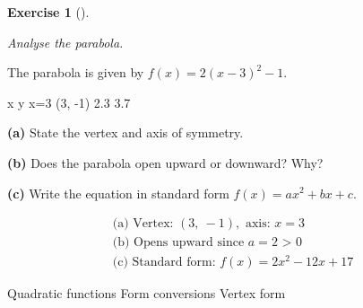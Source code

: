 \documentclass[
  letterpaper,
  DIV=11,
  numbers=noendperiod]{scrreprt}
\theoremstyle{definition}
\newtheorem{exercise}{Exercise}[chapter]
\theoremstyle{remark}
\begin{document}
\begin{exercise}[]\protect\hypertarget{exr-u7-20}{}\label{exr-u7-20}

\emph{Analyse the parabola.}

The parabola is given by \(f(x) = 2(x - 3)^2 - 1\).

x y x=3 (3, -1) 2.3 3.7

\textbf{(a)} State the vertex and axis of symmetry.

\textbf{(b)} Does the parabola open upward or downward? Why?

\textbf{(c)} Write the equation in standard form
\(f(x) = ax^2 + bx + c\).

\begin{tcolorbox}[enhanced jigsaw, opacitybacktitle=0.6, coltitle=black, arc=.35mm, colframe=quarto-callout-tip-color-frame, colback=white, bottomrule=.15mm, left=2mm, colbacktitle=quarto-callout-tip-color!10!white, titlerule=0mm, opacityback=0, title=\textcolor{quarto-callout-tip-color}{\faLightbulb}\hspace{0.5em}{🔍 View Solution}, leftrule=.75mm, breakable, rightrule=.15mm, bottomtitle=1mm, toptitle=1mm, toprule=.15mm]

\[
\begin{aligned}
\text{(a) Vertex: } (3,\ -1), \text{ axis: } x = 3 \\[4pt] \text{(b) Opens upward since } a = 2 \text{{ > 0}} \\[4pt] \text{(c) Standard form: } f(x) = 2x^2 - 12x + 17
\end{aligned}
\]

\end{tcolorbox}

{Quadratic functions} {Form conversions} {Vertex form}

\end{exercise}
\end{document}
